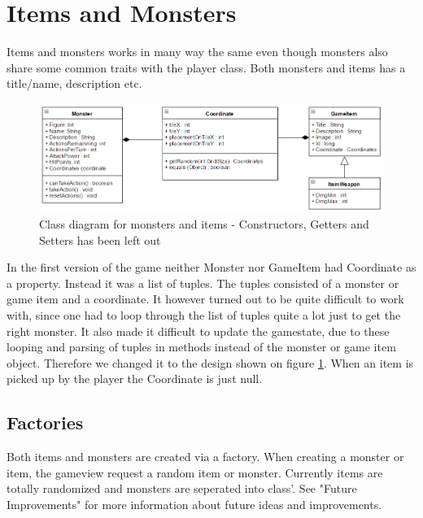 \section{Items and Monsters}

Items and monsters works in many way the same even though monsters also share some common traits with the player class.
Both monsters and items has a title/name, description etc.

\begin{figure}[ht!]
	\centering
	\includegraphics[width=130mm]{images/itemsAndMonstersDiagram.png}
	\caption{Class diagram for monsters and items - Constructors, Getters and Setters has been left out}
	\label{fig:itemsAndMonstersDiagram}
\end{figure}

In the first version of the game neither Monster nor GameItem had Coordinate as a property. Instead it was a list of tuples. The tuples consisted of a monster or game item and a coordinate. It however turned out to be quite difficult to work with, since one had to loop through the list of tuples quite a lot just to get the right monster. It also made it difficult to update the gamestate, due to these looping and parsing of tuples in methods instead of the monster or game item object. Therefore we changed it to the design shown on figure \ref{fig:itemsAndMonstersDiagram}. When an item is picked up by the player the Coordinate is just null. \\

\subsection{Factories}
Both items and monsters are created via a factory. When creating a monster or item, the gameview request a random item or monster. Currently items are totally randomized and monsters are seperated into class'. See "Future Improvements" for more information about future ideas and improvements.
